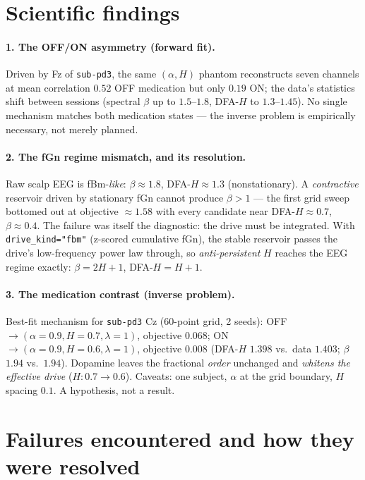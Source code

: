 \documentclass[11pt]{article}
\begin{document}
\section{Scientific findings}

\paragraph{1. The OFF/ON asymmetry (forward fit).}
Driven by Fz of \texttt{sub-pd3}, the same $(\alpha, H)$ phantom reconstructs
seven channels at mean correlation $0.52$ OFF medication but only $0.19$ ON;
the data's statistics shift between sessions (spectral $\beta$ up to
$1.5$--$1.8$, DFA-$H$ to $1.3$--$1.45$). No single mechanism matches both
medication states --- the inverse problem is empirically necessary, not merely
planned.

\paragraph{2. The fGn regime mismatch, and its resolution.}
Raw scalp EEG is fBm-\emph{like}: $\beta \approx 1.8$, DFA-$H \approx 1.3$
(nonstationary). A \emph{contractive} reservoir driven by stationary fGn
cannot produce $\beta > 1$ --- the first grid sweep bottomed out at objective
$\approx 1.58$ with every candidate near DFA-$H \approx 0.7$, $\beta \approx
0.4$. The failure was itself the diagnostic: the drive must be integrated.
With \texttt{drive\_kind="fbm"} (z-scored cumulative fGn), the stable
reservoir passes the drive's low-frequency power law through, so
\emph{anti-persistent} $H$ reaches the EEG regime exactly:
$\beta = 2H+1$, DFA-$H = H+1$.

\paragraph{3. The medication contrast (inverse problem).}
Best-fit mechanism for \texttt{sub-pd3} Cz (60-point grid, 2 seeds):
OFF $\to (\alpha{=}0.9, H{=}0.7, \lambda{=}1)$, objective $0.068$;
ON $\to (\alpha{=}0.9, H{=}0.6, \lambda{=}1)$, objective $0.008$ (DFA-$H$
$1.398$ vs.\ data $1.403$; $\beta$ $1.94$ vs.\ $1.94$). Dopamine leaves the
fractional \emph{order} unchanged and \emph{whitens the effective drive}
($H\colon 0.7 \to 0.6$). Caveats: one subject, $\alpha$ at the grid boundary,
$H$ spacing $0.1$. A hypothesis, not a result.

\section{Failures encountered and how they were resolved}
\end{document}
